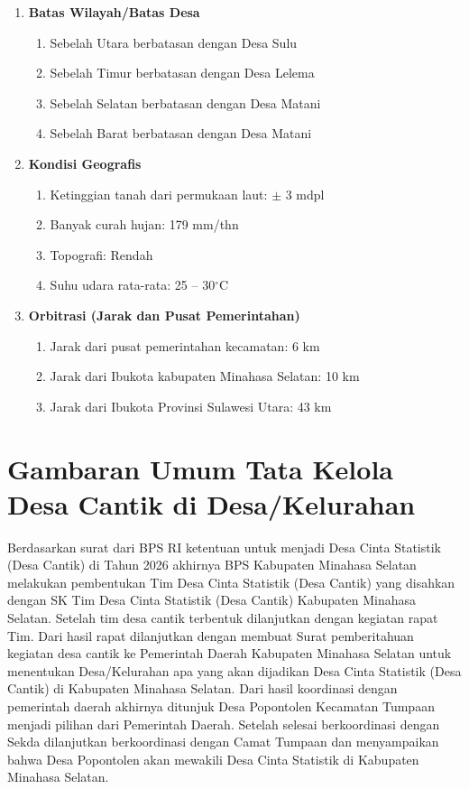 \begin{enumerate}[label=\textbf{\arabic*.}]
  \item \textbf{Batas Wilayah/Batas Desa}
  \begin{enumerate}[label=\alph*.]
    \item Sebelah Utara berbatasan dengan Desa Sulu
    \item Sebelah Timur berbatasan dengan Desa Lelema
    \item Sebelah Selatan berbatasan dengan Desa Matani
    \item Sebelah Barat berbatasan dengan Desa Matani
  \end{enumerate}

  \item \textbf{Kondisi Geografis}
  \begin{enumerate}[label=\alph*.]
    \item Ketinggian tanah dari permukaan laut: $\pm$ 3 mdpl
    \item Banyak curah hujan: 179 mm/thn
    \item Topografi: Rendah
    \item Suhu udara rata-rata: 25 -- 30$^\circ$C
  \end{enumerate}

  \item \textbf{Orbitrasi (Jarak dan Pusat Pemerintahan)}
  \begin{enumerate}[label=\alph*.]
    \item Jarak dari pusat pemerintahan kecamatan: 6 km
    \item Jarak dari Ibukota kabupaten Minahasa Selatan: 10 km
    \item Jarak dari Ibukota Provinsi Sulawesi Utara: 43 km
  \end{enumerate}
\end{enumerate}

\section{Gambaran Umum Tata Kelola Desa Cantik di Desa/Kelurahan}

Berdasarkan surat dari BPS RI ketentuan untuk menjadi Desa Cinta Statistik (Desa Cantik) di Tahun 2026 akhirnya BPS Kabupaten Minahasa Selatan melakukan pembentukan Tim Desa Cinta Statistik (Desa Cantik) yang disahkan dengan SK Tim Desa Cinta Statistik (Desa Cantik) Kabupaten Minahasa Selatan. Setelah tim desa cantik terbentuk dilanjutkan dengan kegiatan rapat Tim. Dari hasil rapat dilanjutkan dengan membuat Surat pemberitahuan kegiatan desa cantik ke Pemerintah Daerah Kabupaten Minahasa Selatan untuk menentukan Desa/Kelurahan apa yang akan dijadikan Desa Cinta Statistik (Desa Cantik) di Kabupaten Minahasa Selatan. Dari hasil koordinasi dengan pemerintah daerah akhirnya ditunjuk Desa Popontolen Kecamatan Tumpaan menjadi pilihan dari Pemerintah Daerah. Setelah selesai berkoordinasi dengan Sekda dilanjutkan berkoordinasi dengan Camat Tumpaan dan menyampaikan bahwa Desa Popontolen akan mewakili Desa Cinta Statistik di Kabupaten Minahasa Selatan.

